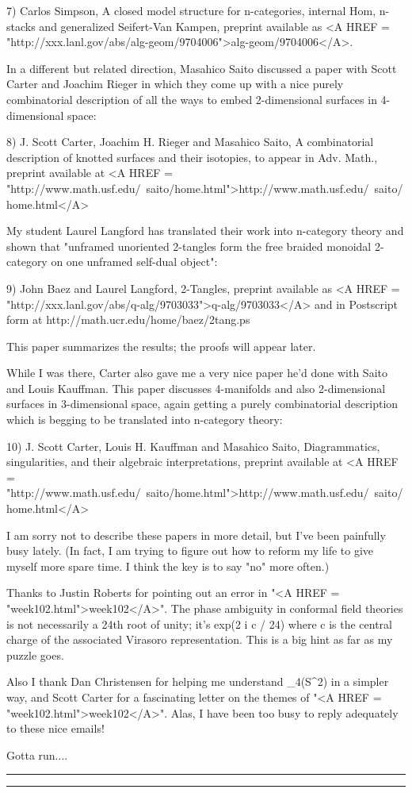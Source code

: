 7) Carlos Simpson, A closed model structure for n-categories, internal
Hom, n-stacks and generalized Seifert-Van Kampen, preprint available as
<A HREF = "http://xxx.lanl.gov/abs/alg-geom/9704006">alg-geom/9704006</A>.

In a different but related direction, Masahico Saito discussed
a paper with Scott Carter and Joachim Rieger in which they come
up with a nice purely combinatorial description of all the ways
to embed 2-dimensional surfaces in 4-dimensional space:

8) J. Scott Carter, Joachim H. Rieger and Masahico Saito,
A combinatorial description of knotted surfaces and their isotopies,
to appear in Adv. Math., preprint available at 
<A HREF = "http://www.math.usf.edu/~saito/home.html">http://www.math.usf.edu/~saito/home.html</A>
 
My student Laurel Langford has translated their work into 
n-category theory and shown that "unframed unoriented 2-tangles 
form the free braided monoidal 2-category on one unframed
self-dual object":

9) John Baez and Laurel Langford, 2-Tangles, preprint available
as <A HREF = "http://xxx.lanl.gov/abs/q-alg/9703033">q-alg/9703033</A> and in Postscript form at 
http://math.ucr.edu/home/baez/2tang.ps  

This paper summarizes the results; the proofs will appear later.

While I was there, Carter also gave me a very nice paper
he'd done with Saito and Louis Kauffman.  This paper discusses
4-manifolds and also 2-dimensional surfaces in 3-dimensional space,
again getting a purely combinatorial description which is begging
to be translated into n-category theory:

10) J. Scott Carter, Louis H. Kauffman and Masahico Saito, 
Diagrammatics, singularities, and their algebraic interpretations,
preprint available at <A HREF = "http://www.math.usf.edu/~saito/home.html">http://www.math.usf.edu/~saito/home.html</A>
 
I am sorry not to describe these papers in more detail, but
I've been painfully busy lately.  (In fact, I am trying
to figure out how to reform my life to give myself more spare
time.  I think the key is to say "no" more often.)

Thanks to Justin Roberts for pointing out an error in "<A HREF = "week102.html">week102</A>".  
The phase ambiguity in conformal field theories is not necessarily a
24th root of unity; it's exp(2 \pi  i c / 24) where c is the central
charge of the associated Virasoro representation.   This is a big
hint as far as my puzzle goes.  

Also I thank Dan Christensen for helping me understand \pi _4(S^2)
in a simpler way, and Scott Carter for a fascinating letter on 
the themes of "<A HREF = "week102.html">week102</A>".  Alas, I have been too busy to reply
adequately to these nice emails!

Gotta run....  



\par\noindent\rule{\textwidth}{0.4pt}
\par\noindent\rule{\textwidth}{0.4pt}

